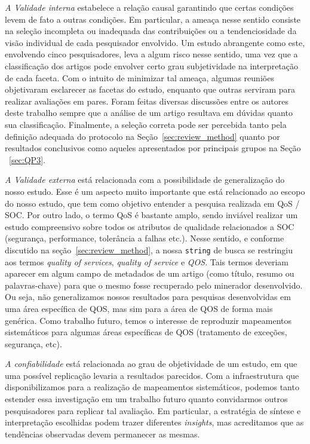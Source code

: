 \emph{A Validade interna} estabelece a rela\c{c}\~{a}o causal garantindo que certas condi\c{c}\~{o}es levem de fato a outras condi\c{c}\~{o}es. Em particular, a ameaça nesse sentido consiste na seleção incompleta ou inadequada das contribuições ou a tendenciosidade da visão individual de cada pesquisador envolvido. Um estudo abrangente como este, envolvendo cinco pesquisadores, leva a algum risco nesse sentido, uma vez que a classifica\c c\~{a}o dos artigos pode envolver certo grau subjetividade na interpreta\c{c}\~{a}o de cada faceta. Com o intuito de minimizar tal amea\c{c}a, algumas reuni\~{o}es objetivaram esclarecer as facetas do estudo, enquanto que outras serviram para realizar avalia\c c\~{o}es em pares. Foram feitas diversas discuss\~{o}es entre os autores deste trabalho sempre que a an\'{a}lise de um artigo resultava em d\'{u}vidas quanto sua classifica\c c\~{a}o. Finalmente, a seleção correta pode ser percebida tanto pela definição adequada do protocolo na Seção~\ref{sec:review_method} quanto por 
resultados conclusivos como aqueles apresentados por principais grupos na Se\c{c}\~{a}o ~\ref{sec:QP3}.

\emph{A Validade externa} est\'{a} relacionada com a possibilidade de
generaliza\c c\~{a}o do nosso estudo. Esse \'{e} um aspecto muito
importante que est\'{a} relacionado ao escopo do nosso estudo, que tem
como objetivo entender a pesquisa realizada em QoS / SOC. Por outro
lado, o termo QoS \'{e} bastante amplo, sendo invi\'{a}vel realizar
um estudo compreensivo sobre todos os atributos de qualidade
relacionados a SOC (seguran\c ca, performance, toler\^{a}ncia a falhas
etc.). Nesse sentido, e conforme discutido na se\c{c}\~{a}o~\ref{sec:review_method}, a nossa \texttt{string} de busca se restringiu aos termos \emph{quality of services}, \emph{quality of service} e \emph{QOS}. Tais termos deveriam aparecer em algum campo de metadados de um artigo (como t\'{i}tulo, resumo ou palavras-chave) para que o mesmo fosse recuperado pelo minerador desenvolvido. Ou seja, n\~{a}o generalizamos nossos resultados para pesquisas desenvolvidas em uma \'{a}rea espec\'{i}fica de QOS, mas sim para a \'{a}rea de QOS de forma mais gen\'{e}rica. Como
trabalho futuro, temos o interesse de reproduzir mapeamentos sistem\'{a}ticos para algumas \'{a}reas espec\'{i}ficas de QOS (tratamento de exce\c
c\~{o}es, seguran\c ca, etc). 

\emph{A confiabilidade} est\'{a} relacionada ao grau de objetividade de
um estudo, em que uma poss\'{i}vel replica\c c\~{a}o levaria a
resultados parecidos. Com a infraestrutura que disponibilizamos para a realiza\c{c}\~{a}o de mapeamentos sistem\'{a}ticos, podemos tanto estender essa investiga\c c\~{a}o em um trabalho futuro quanto convidarmos outros pesquisadores para replicar tal avalia\c c\~{a}o. Em particular, a estrat\'{e}gia de s\'{i}ntese e interpreta\c{c}\~{a}o escolhidas podem trazer diferentes \emph{insights}, mas acreditamos que as tend\^{e}ncias observadas devem permanecer as mesmas.